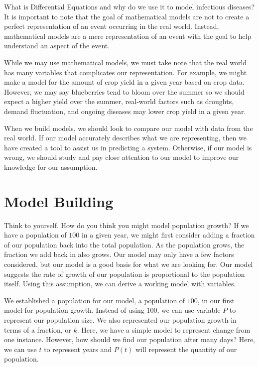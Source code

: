 \documentclass{amsart}
\theoremstyle{definition}
\numberwithin{equation}{section}
\begin{document}
\begin{sansmath}
What is Differential Equations and why do we use it to model infectious diseases? It is important to note that the goal of mathematical models are not to create a perfect representation of an event occurring in the real world. Instead, mathematical models are a mere representation of an event with the goal to help understand an aspect of the event. %

While we may use mathematical models, we must take note that the real world has many variables that complicates our representation. For example, we might make a model for the amount of crop yield in a given year based on crop data. However, we may say blueberries tend to bloom over the summer so we should expect a higher yield over the summer, real-world factors such as droughts, demand fluctuation, and ongoing diseases may lower crop yield in a given year.

When we build models, we should look to compare our model with data from the real world. If our model accurately describes what we are representing, then we have created a tool to assist us in predicting a system. Otherwise, if our model is wrong, we should study and pay close attention to our model to improve our knowledge for our assumption.

\section{Model Building}

Think to yourself. How do you think you might model population growth? If we have a population of $100$ in a given year, we might first consider adding a fraction of our population back into the total population. As the population grows, the fraction we add back in also grows. Our model may only have a few factors considered, but our model is a good basis for what we are looking for. Our model suggests the rate of growth of our population is proportional to the population itself. Using this assumption, we can derive a working model with variables.

We established a population for our model, a population of $100$, in our first model for population growth. Instead of using $100$, we can use variable $P$ to represent our population size. We also represented our population growth in terms of a fraction, or $k$. Here, we have a simple model to represent change from one instance. However, how should we find our population after many days? Here, we can use $t$ to represent years and $P(t)$ will represent the quantity of our population.


\end{sansmath}
\end{document}
